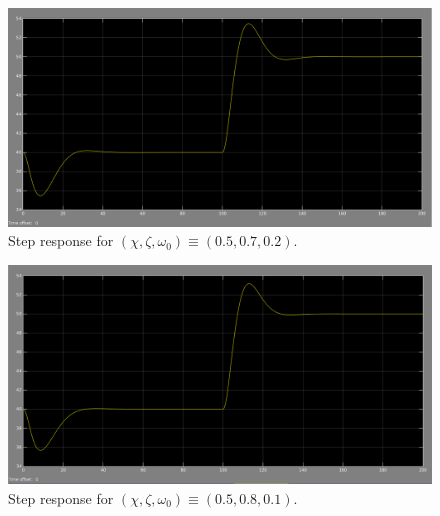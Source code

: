 \begin{figure}[H]\centering
  \includegraphics[scale=0.3]{./images/5/tank_2_setting_2.png}
  \caption{Step response for $(\chi, \zeta, \omega_0) \equiv (0.5, 0.7, 0.2)$.}
  \label{fig:Q5.2}
\end{figure}

\begin{figure}[H]\centering
  \includegraphics[scale=0.3]{./images/5/tank_2_setting_3.png}
  \caption{Step response for $(\chi, \zeta, \omega_0) \equiv (0.5, 0.8, 0.1)$.}
  \label{fig:Q5.3}
\end{figure}
